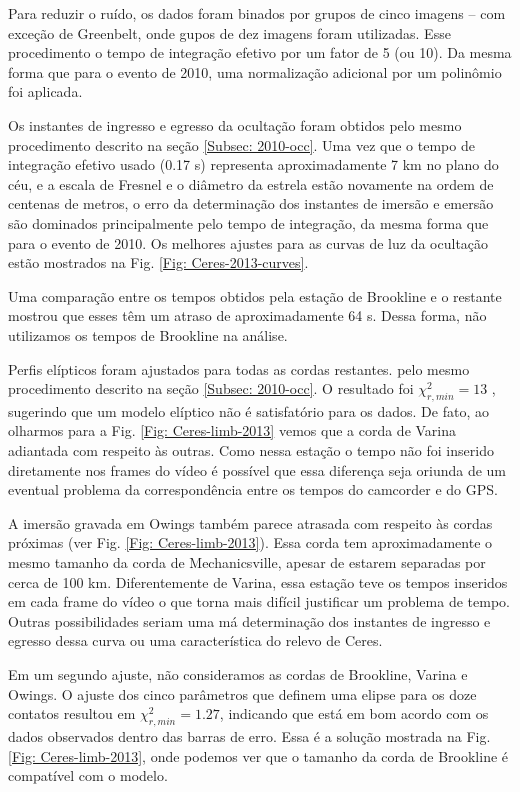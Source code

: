 \documentclass[12pt,a4paper]{monografia}
\begin{document}
Para reduzir o ruído, os dados foram binados por grupos de cinco imagens -- com exceção de Greenbelt, onde gupos de dez imagens foram utilizadas. Esse procedimento o tempo de integração efetivo por um fator de 5 (ou 10). Da mesma forma que para o evento de 2010, uma normalização adicional por um polinômio foi aplicada.

Os instantes de ingresso e egresso da ocultação foram obtidos pelo mesmo procedimento descrito na seção \ref{Subsec: 2010-occ}. Uma vez que o tempo de integração efetivo usado (0.17 s) representa aproximadamente 7 km no plano do céu, e a escala de Fresnel e  o diâmetro da estrela estão novamente na ordem de centenas de metros, o erro da determinação dos instantes de imersão e emersão são dominados principalmente pelo tempo de integração, da mesma forma que para o evento de 2010. Os melhores ajustes para as curvas de luz da ocultação estão mostrados na Fig. \ref{Fig: Ceres-2013-curves}.

Uma comparação entre os tempos obtidos pela estação de Brookline e o restante mostrou que esses têm um atraso de aproximadamente 64 s. Dessa forma, não utilizamos os tempos de Brookline na análise.

Perfis elípticos foram ajustados para todas as cordas restantes. pelo mesmo procedimento descrito na seção \ref{Subsec: 2010-occ}. O resultado foi $\chi^2_{r,min} = 13$ , sugerindo que um modelo elíptico não é satisfatório para os dados. De fato, ao olharmos para a Fig. \ref{Fig: Ceres-limb-2013} vemos que a corda de Varina adiantada com respeito às outras. Como nessa estação o tempo não foi inserido diretamente nos frames do vídeo é possível que essa diferença seja oriunda de um eventual problema da correspondência entre os tempos do camcorder e do GPS.

A imersão gravada em Owings também parece atrasada com respeito às cordas próximas (ver Fig. \ref{Fig: Ceres-limb-2013}). Essa corda tem aproximadamente o mesmo tamanho da corda de Mechanicsville, apesar de estarem separadas por cerca de 100 km. Diferentemente de Varina, essa estação teve os tempos inseridos em cada frame do vídeo o que torna mais difícil justificar um problema de tempo. Outras possibilidades seriam uma má determinação dos instantes de ingresso e egresso dessa curva ou uma característica do relevo de Ceres.

Em um segundo ajuste, não consideramos as cordas de Brookline, Varina e Owings. O ajuste dos cinco parâmetros que definem uma elipse para os doze contatos resultou em $\chi^2_{r,min} = 1.27$, indicando  que está em bom acordo com os dados observados dentro das barras de erro. Essa é a solução mostrada na Fig. \ref{Fig: Ceres-limb-2013}, onde podemos ver que o tamanho da corda de Brookline é compatível com o modelo.
\end{document}
